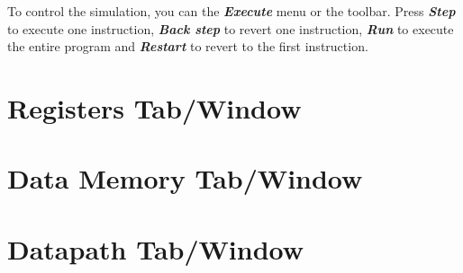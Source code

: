 \documentclass[11pt,a4paper,twoside,titlepage]{article}
\newcommand{\menupath}[1]{\textbf{\emph{#1}}}
\begin{document}
To control the simulation, you can the \menupath{Execute} menu or the toolbar.
Press \menupath{Step} to execute one instruction, \menupath{Back step}
to revert one instruction, \menupath{Run} to execute the entire program and
\menupath{Restart} to revert to the first instruction.


\section{Registers Tab/Window}

\section{Data Memory Tab/Window}

\section{Datapath Tab/Window}

\end{document}
